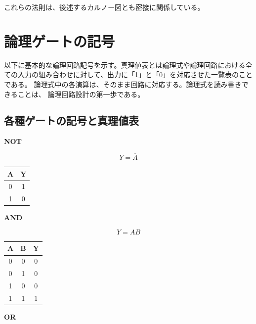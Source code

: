 これらの法則は、後述するカルノー図とも密接に関係している。


\section{論理ゲートの記号}
以下に基本的な論理回路記号を示す。真理値表とは論理式や論理回路における全ての入力の組み合わせに対して、出力に「1」と「0」を対応させた一覧表のことである。
論理式中の各演算は、そのまま回路に対応する。論理式を読み書きできることは、
論理回路設計の第一歩である。
\\
\subsection{各種ゲートの記号と真理値表}
\begin{center}
\begin{minipage}[t]{0.32\textwidth}
\centering
\textbf{NOT}


\[
Y=\overline{A}
\]

\begin{tabular}{c|c}
\toprule
A & Y\\
\midrule
0 & 1\\
1 & 0\\
\bottomrule
\end{tabular}
\end{minipage}
\hfill
\begin{minipage}[t]{0.32\textwidth}
\centering
\textbf{AND}


\[
Y=AB
\]

\begin{tabular}{cc|c}
\toprule
A & B & Y\\
\midrule
0 & 0 & 0\\
0 & 1 & 0\\
1 & 0 & 0\\
1 & 1 & 1\\
\bottomrule
\end{tabular}
\end{minipage}
\hfill
\begin{minipage}[t]{0.32\textwidth}
\centering
\textbf{OR}


\end{minipage}
\end{center}
